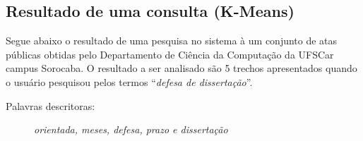 \newpage

\subsection*{Resultado de uma consulta (K-Means)}

Segue abaixo o resultado de uma pesquisa no sistema à um conjunto de atas públicas obtidas pelo Departamento de Ciência da Computação da UFSCar campus Sorocaba. O resultado a ser analisado são 5 trechos apresentados quando o usuário pesquisou pelos termos ``\textit{defesa de dissertação}''.

\vspace{0.5 cm}

\begin{description}
	\item[Palavras descritoras: ] \textit{orientada, meses, defesa, prazo e dissertação}
\end{description}


